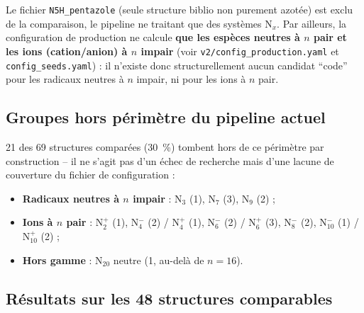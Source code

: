 \documentclass[11pt,a4paper]{article}
\begin{document}
Le fichier \texttt{N5H\_pentazole} (seule structure biblio non purement
azot\'ee) est exclu de la comparaison, le pipeline ne traitant que des
syst\`emes N$_x$. Par ailleurs, la configuration de production ne calcule
\textbf{que les esp\`eces neutres \`a $n$ pair et les ions (cation/anion)
\`a $n$ impair} (voir \texttt{v2/config\_production.yaml} et
\texttt{config\_seeds.yaml}) : il n'existe donc structurellement aucun
candidat ``code'' pour les radicaux neutres \`a $n$ impair, ni pour les
ions \`a $n$ pair.

\subsection{Groupes hors p\'erim\`etre du pipeline actuel}

21 des 69 structures compar\'ees (30~\%) tombent hors de ce p\'erim\`etre
par construction -- il ne s'agit pas d'un \'echec de recherche mais d'une
lacune de couverture du fichier de configuration :
\begin{itemize}
  \item \textbf{Radicaux neutres \`a $n$ impair} : N$_3$ (1), N$_7$ (3),
  N$_9$ (2) ;
  \item \textbf{Ions \`a $n$ pair} : N$_2^{+}$ (1), N$_4^{-}$ (2) /
  N$_4^{+}$ (1), N$_6^{-}$ (2) / N$_6^{+}$ (3), N$_8^{-}$ (2),
  N$_{10}^{-}$ (1) / N$_{10}^{+}$ (2) ;
  \item \textbf{Hors gamme} : N$_{20}$ neutre (1, au-del\`a de $n=16$).
\end{itemize}

\subsection{R\'esultats sur les 48 structures comparables}
\end{document}
